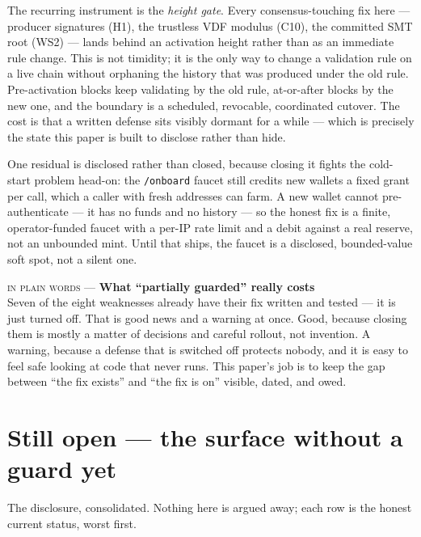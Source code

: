 \documentclass[10pt,a4paper]{article}
\newcommand{\layman}[3]{%
\begin{tcolorbox}[enhanced,
  interior style={left color=#1!9,right color=white},
  colframe=#1!45!slate,boxrule=0.5pt,arc=3pt,
  borderline west={2.5pt}{0pt}{#1},
  left=9pt,right=9pt,top=7pt,bottom=7pt]
{\scriptsize\textcolor{#1}{\textsc{in plain words}}\; — \;\textbf{\small #2}}\\[3pt]
\small #3
\end{tcolorbox}}
\begin{document}
The recurring instrument is the \emph{height gate}. Every consensus-touching fix here —
producer signatures (H1), the trustless VDF modulus (C10), the committed SMT root (WS2) —
lands behind an activation height rather than as an immediate rule change. This is not
timidity; it is the only way to change a validation rule on a live chain without orphaning
the history that was produced under the old rule. Pre-activation blocks keep validating by
the old rule, at-or-after blocks by the new one, and the boundary is a scheduled, revocable,
coordinated cutover. The cost is that a written defense sits visibly dormant for a while —
which is precisely the state this paper is built to disclose rather than hide.

One residual is disclosed rather than closed, because closing it fights the cold-start
problem head-on: the \texttt{/onboard} faucet still credits new wallets a fixed grant per
call, which a caller with fresh addresses can farm. A new wallet cannot pre-authenticate —
it has no funds and no history — so the honest fix is a finite, operator-funded faucet with
a per-IP rate limit and a debit against a real reserve, not an unbounded mint. Until that
ships, the faucet is a disclosed, bounded-value soft spot, not a silent one.

\layman{sigilamber}{What ``partially guarded'' really costs}{Seven of the eight weaknesses
already have their fix written and tested — it is just turned off. That is good news and a
warning at once. Good, because closing them is mostly a matter of decisions and careful
rollout, not invention. A warning, because a defense that is switched off protects nobody,
and it is easy to feel safe looking at code that never runs. This paper's job is to keep the
gap between ``the fix exists'' and ``the fix is on'' visible, dated, and owed.}

\section{Still open — the surface without a guard yet}
\label{sec:open}

The disclosure, consolidated. Nothing here is argued away; each row is the honest current
status, worst first.
\end{document}
